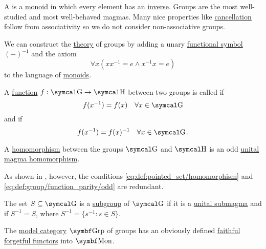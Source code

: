 \begin{definition}\label{def:group}
  A  is a \hyperref[def:unital_magma/associative]{monoid} in which every element has an \hyperref[def:unital_magma_inverse_element]{inverse}. Groups are the most well-studied and most well-behaved magmas. Many nice properties like \hyperref[thm:group_properties/cancellative]{cancellation} follow from associativity so we do not consider non-associative groups.

  \begin{DefEnum}
     We can construct the \hyperref[def:first_order_theory]{theory} of groups by adding a unary \hyperref[def:first_order_logic_alphabet/func]{functional symbol} \( (-)^{-1} \) and the axiom
    \begin{equation}\label{eq:def:group/theory/inverse_axiom}
      \forall x (xx^{-1} = e \wedge x^{-1}x = e)
    \end{equation}
    to the language of \hyperref[def:unital_magma/associative]{monoids}.

     A \hyperref[def:function/single_valued]{function} \( f: \CG \to \CH \) between two groups is called  if
    \begin{equation}\label{eq:def:group/function_parity/even}
      f(x^{-1}) = f(x) \quad\forall x \in \CG
    \end{equation}
    and  if
    \begin{equation}\label{eq:def:group/function_parity/odd}
      f(x^{-1}) = f(x)^{-1} \quad\forall x \in \CG.
    \end{equation}

     A \hyperref[def:first_order_homomorphism]{homomorphism} between the groups \( \CG \) and \( \CH \) is an odd \hyperref[def:unital_magma/homomorphism]{unital magma homomorphism}.

    As shown in , however, the conditions \eqref{eq:def:pointed_set/homomorphism} and \eqref{eq:def:group/function_parity/odd} are redundant.

     The set \( S \subseteq \CG \) is a \hyperref[def:first_order_substructure]{subgroup} of \( \CG \) if it is a \hyperref[def:unital_magma/substructure]{unital submagma} and if \( S^{-1} = S \), where \( S^{-1} = \{ s^{-1} \colon s \in S \} \).

     The \hyperref[def:first_order_model_category]{model category} \( \Cat{Grp} \) of groups has an obviously defined \hyperref[def:faithful_full_functor]{faithful} \hyperref[def:forgetful_functor]{forgetful functors} into \hyperref[def:unital_magma/associative]{\( \Cat{Mon} \)}.


\end{DefEnum}
\end{definition}

